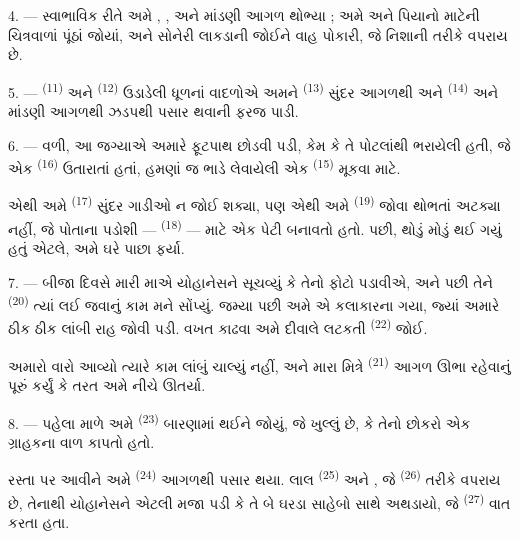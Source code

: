 4. --- સ્વાભાવિક રીતે અમે , ,
 અને  માંડણી આગળ થોભ્યા ; અમે
 અને પિયાનો માટેની 
ચિત્રવાળાં પૂંઠાં જોયાં, અને સોનેરી લાકડાની  જોઈને વાહ
પોકારી, જે નિશાની તરીકે વપરાય છે.

5. ---  \textsuperscript{(11)} અને
 \textsuperscript{(12)} ઉડાડેલી ધૂળનાં વાદળોએ અમને
 \textsuperscript{(13)} સુંદર
 આગળથી અને  \textsuperscript{(14)}
 અને  માંડણી આગળથી ઝડપથી પસાર થવાની ફરજ
પાડી.

6. --- વળી, આ જગ્યાએ અમારે ફૂટપાથ છોડવી પડી, કેમ કે તે પોટલાંથી
ભરાયેલી હતી, જે એક  \textsuperscript{(16)}
ઉતારાતાં હતાં, હમણાં જ ભાડે લેવાયેલી એક 
\textsuperscript{(15)} મૂકવા માટે.

એથી અમે  \textsuperscript{(17)} સુંદર ગાડીઓ ન
જોઈ શક્યા, પણ એથી અમે  \textsuperscript{(19)}
જોવા થોભતાં અટક્યા નહીં, જે પોતાના પડોશી —  \textsuperscript{(18)} — માટે એક પેટી બનાવતો હતો. પછી, થોડું
મોડું થઈ ગયું હતું એટલે, અમે ઘરે પાછા ફર્યા.

\VUsaut{3.0mm}

7. --- બીજા દિવસે મારી માએ યોહાનેસને સૂચવ્યું કે તેનો ફોટો પડાવીએ,
અને પછી તેને  \textsuperscript{(20)} ત્યાં લઈ
જવાનું કામ મને સોંપ્યું. જમ્યા પછી અમે એ કલાકારના 
ગયા, જ્યાં અમારે ઠીક ઠીક લાંબી રાહ જોવી પડી. વખત કાઢવા અમે દીવાલે
લટકતી  \textsuperscript{(22)} જોઈ.

અમારો વારો આવ્યો ત્યારે કામ લાંબું ચાલ્યું નહીં, અને મારા મિત્રે
 \textsuperscript{(21)} આગળ ઊભા રહેવાનું પૂરું કર્યું કે
તરત અમે નીચે ઊતર્યા.

8. --- પહેલા માળે અમે  \textsuperscript{(23)} બારણામાં
થઈને જોયું, જે ખુલ્લું છે, કે તેનો છોકરો એક ગ્રાહકના વાળ કાપતો હતો.

રસ્તા પર આવીને અમે  \textsuperscript{(24)} આગળથી
પસાર થયા. લાલ  \textsuperscript{(25)} અને , જે  \textsuperscript{(26)} તરીકે વપરાય છે, તેનાથી
યોહાનેસને એટલી મજા પડી કે તે બે ઘરડા સાહેબો સાથે અથડાયો, જે
 \textsuperscript{(27)} વાત કરતા હતા.


